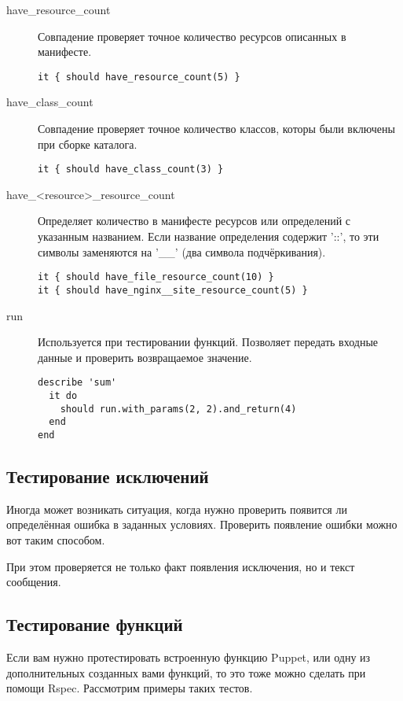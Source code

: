 \begin{description}
\item[have\_resource\_count]
Совпадение проверяет точное количество ресурсов описанных в манифесте.

\begin{lstlisting}
it { should have_resource_count(5) }
\end{lstlisting}

\item[have\_class\_count]
Совпадение проверяет точное количество классов, которы были включены при сборке каталога.

\begin{lstlisting}
it { should have_class_count(3) }
\end{lstlisting}

\item[have\_\textless{}resource\textgreater{}\_resource\_count]
Определяет количество в манифесте ресурсов или определений с указанным названием. Если название определения содержит '::', то эти символы заменяются на '\_\_' (два символа подчёркивания).

\begin{lstlisting}
it { should have_file_resource_count(10) }
it { should have_nginx__site_resource_count(5) }
\end{lstlisting}

\item[run]
Используется при тестировании функций. Позволяет передать входные данные и проверить возвращаемое значение.

\begin{lstlisting}
describe 'sum'
  it do
    should run.with_params(2, 2).and_return(4)
  end
end
\end{lstlisting}

\end{description}

\subsection{Тестирование исключений}

Иногда может возникать ситуация, когда нужно проверить появится ли определённая ошибка в заданных условиях. Проверить появление ошибки можно вот таким способом.



При этом проверяется не только факт появления исключения, но и текст сообщения.

\subsection{Тестирование функций}

Если вам нужно протестировать встроенную функцию Puppet, или одну из дополнительных созданных вами функций, то это тоже можно сделать при помощи Rspec. Рассмотрим примеры таких тестов.




